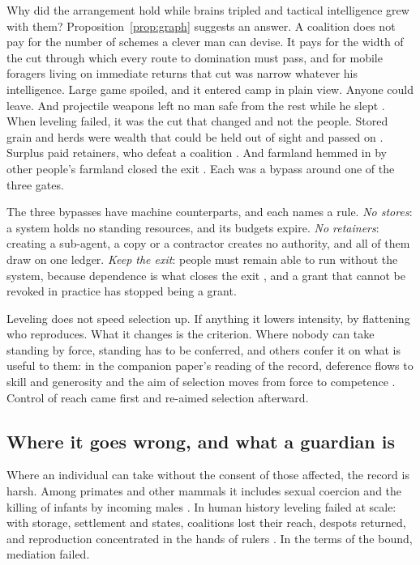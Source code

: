 \documentclass[10pt,twocolumn]{article}
\theoremstyle{plain}
\theoremstyle{definition}
\begin{document}
Why did the arrangement hold while brains tripled and tactical intelligence grew with
them? Proposition~\ref{prop:graph} suggests an answer. A coalition does not pay for the
number of schemes a clever man can devise. It pays for the width of the cut through which
every route to domination must pass, and for mobile foragers living on immediate returns
that cut was narrow whatever his intelligence. Large game spoiled, and it entered camp in
plain view. Anyone could leave. And projectile weapons left no man safe from the rest while
he slept \cite{woodburn1982,bingham1999}. When leveling failed, it was the cut that changed
and not the people. Stored grain and herds were wealth that could be held out of sight and
passed on \cite{borgerhoff2009}. Surplus paid retainers, who defeat a coalition
\cite{betzig1986}. And farmland hemmed in by other people's farmland closed the exit
\cite{carneiro1970}. Each was a bypass around one of the three gates.

The three bypasses have machine counterparts, and each names a rule. \emph{No stores}: a
system holds no standing resources, and its budgets expire. \emph{No retainers}: creating a
sub-agent, a copy or a contractor creates no authority, and all of them draw on one ledger.
\emph{Keep the exit}: people must remain able to run without the system, because dependence
is what closes the exit \cite{kulveit2025}, and a grant that cannot be revoked in practice
has stopped being a grant.

Leveling does not speed selection up. If anything it lowers intensity, by flattening who
reproduces. What it changes is the criterion. Where nobody can take standing by force,
standing has to be conferred, and others confer it on what is useful to them: in the
companion paper's reading of the record, deference flows to skill and generosity and the aim
of selection moves from force to competence \cite{taylor2026pbo}. Control of reach came
first and re-aimed selection afterward.

\subsection{Where it goes wrong, and what a guardian is}

Where an individual can take without the consent of those affected, the record is harsh.
Among primates and other mammals it includes sexual coercion \cite{smuts1993} and the killing
of infants by incoming males \cite{hrdy1979}. In human history leveling failed at scale: with
storage, settlement and states, coalitions lost their reach, despots returned, and
reproduction concentrated in the hands of rulers \cite{betzig1986}. In the terms of the
bound, mediation failed.
\end{document}
